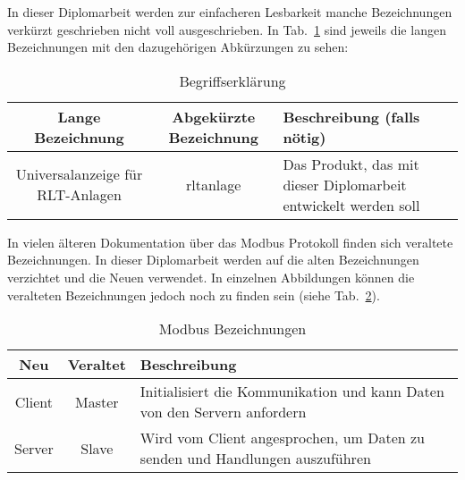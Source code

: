 


In dieser Diplomarbeit werden zur einfacheren Lesbarkeit manche Bezeichnungen verkürzt geschrieben \bzw nicht voll ausgeschrieben. In Tab.~\ref{tab:begriffserklaerung} sind jeweils die langen Bezeichnungen mit den dazugehörigen Abkürzungen zu sehen:
\begin{table}[h]
	\caption{Begriffserklärung \label{tab:begriffserklaerung}}
	\begin{tabularx}{\textwidth}{@{}c|c|X@{}}
		\toprule
		\textbf{Lange Bezeichnung} & \textbf{Abgekürzte Bezeichnung} & \textbf{Beschreibung (falls nötig)} \\
		\midrule
		Universalanzeige für RLT-Anlagen & \acs{rltanlage} & Das Produkt, das mit dieser Diplomarbeit entwickelt werden soll \\
		\bottomrule
	\end{tabularx}
\end{table}


In vielen älteren Dokumentation über das Modbus Protokoll finden sich veraltete Bezeichnungen. In dieser Diplomarbeit werden auf die alten Bezeichnungen verzichtet und die Neuen verwendet. In einzelnen Abbildungen können die veralteten Bezeichnungen jedoch noch zu finden sein (siehe Tab.~\ref{tab:modbus_bezeichnung}). 
\begin{table}[h]
	\caption{Modbus Bezeichnungen \label{tab:modbus_bezeichnung}}
	\begin{tabularx}{\textwidth}{@{}c|c|X@{}}
		\toprule
		\textbf{Neu} & \textbf{Veraltet} & \textbf{Beschreibung} \\
		\midrule
		Client & Master & Initialisiert die Kommunikation und kann Daten von den Servern anfordern \\
		Server & Slave & Wird vom Client angesprochen, um Daten zu senden und Handlungen auszuführen \\
		\bottomrule
	\end{tabularx}
\end{table}



